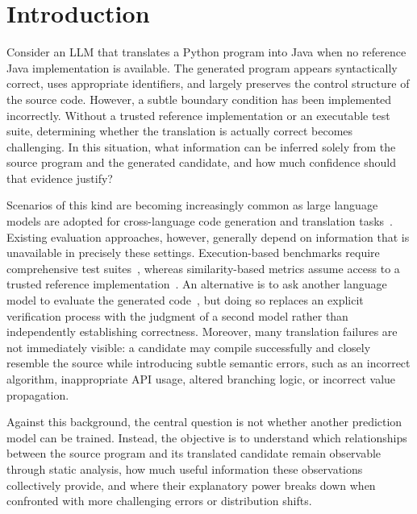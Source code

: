 \documentclass[conference]{IEEEtran}
\begin{document}
\section{Introduction}
Consider an LLM that translates a Python program into Java when no reference Java implementation is available. The generated program appears syntactically correct, uses appropriate identifiers, and largely preserves the control structure of the source code. However, a subtle boundary condition has been implemented incorrectly. Without a trusted reference implementation or an executable test suite, determining whether the translation is actually correct becomes challenging. In this situation, what information can be inferred solely from the source program and the generated candidate, and how much confidence should that evidence justify?

Scenarios of this kind are becoming increasingly common as large language models are adopted for cross-language code generation and translation tasks~\cite{chen2021evaluating,roziere2020transcoder,zheng2023codegeex,cassano2023multiple}. Existing evaluation approaches, however, generally depend on information that is unavailable in precisely these settings. Execution-based benchmarks require comprehensive test suites~\cite{chen2021evaluating,cassano2023multiple}, whereas similarity-based metrics assume access to a trusted reference implementation~\cite{papineni2002bleu,ren2020codebleu,eghbali2022crystalbleu}. An alternative is to ask another language model to evaluate the generated code~\cite{zhuo2024icescore,tong2024codejudge,aggarwal2024codesift}, but doing so replaces an explicit verification process with the judgment of a second model rather than independently establishing correctness. Moreover, many translation failures are not immediately visible: a candidate may compile successfully and closely resemble the source while introducing subtle semantic errors, such as an incorrect algorithm, inappropriate API usage, altered branching logic, or incorrect value propagation.

Against this background, the central question is not whether another prediction model can be trained. Instead, the objective is to understand which relationships between the source program and its translated candidate remain observable through static analysis, how much useful information these observations collectively provide, and where their explanatory power breaks down when confronted with more challenging errors or distribution shifts.
\end{document}
